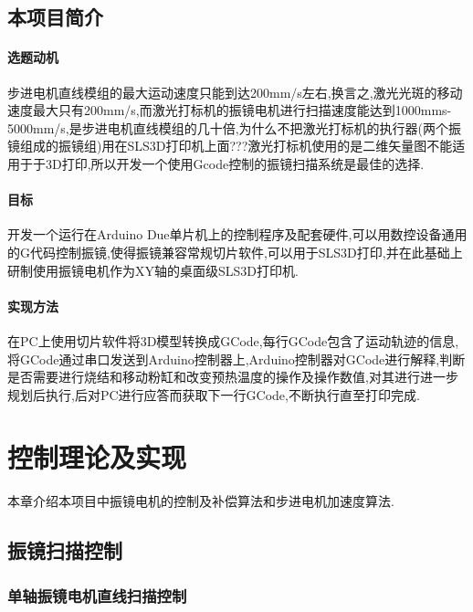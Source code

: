 \documentclass[a4paper,12pt,onecolumn,twoside]{article}
\begin{document}
\subsection{本项目简介}
\paragraph{选题动机}
步进电机直线模组的最大运动速度只能到达200mm/s左右,换言之,激光光斑的移动速度最大只有200mm/s,而激光打标机的振镜电机进行扫描速度能达到1000mms-5000mm/s,是步进电机直线模组的几十倍,为什么不把激光打标机的执行器(两个振镜组成的振镜组)用在SLS3D打印机上面???激光打标机使用的是二维矢量图不能适用于于3D打印,所以开发一个使用Gcode控制的振镜扫描系统是最佳的选择.
\paragraph{目标}
开发一个运行在Arduino Due单片机上的控制程序及配套硬件,可以用数控设备通用的G代码控制振镜,使得振镜兼容常规切片软件,可以用于SLS3D打印,并在此基础上研制使用振镜电机作为XY轴的桌面级SLS3D打印机.
\paragraph{实现方法}
在PC上使用切片软件将3D模型转换成GCode,每行GCode包含了运动轨迹的信息,将GCode通过串口发送到Arduino控制器上,Arduino控制器对GCode进行解释,判断是否需要进行烧结和移动粉缸和改变预热温度的操作及操作数值,对其进行进一步规划后执行,后对PC进行应答而获取下一行GCode,不断执行直至打印完成.
\newpage
\section{控制理论及实现}
本章介绍本项目中振镜电机的控制及补偿算法和步进电机加速度算法.
\subsection{振镜扫描控制}
\subsubsection{单轴振镜电机直线扫描控制}
\end{document}
